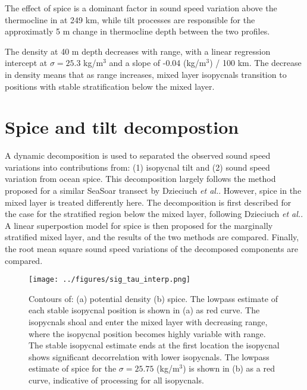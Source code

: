 \documentclass[preprint,NumberedRefs]{JASA}
\begin{document}
The effect of spice is a dominant factor in sound speed variation above the thermocline in at 249 km, while tilt processes are responsible for the approximatly 5 m change in thermocline depth between the two profiles.

The density at 40 m depth decreases with range, with a linear regression intercept at $\sigma=25.3$ kg/m$^3$ and a slope of -0.04 (kg/m$^3$) / 100 km. The decrease in density means that as range increases, mixed layer isopycnals transition to positions with stable stratification below the mixed layer.

\section{\label{sec:decomposition}Spice and tilt decompostion}
A dynamic decomposition is used to separated the observed sound speed variations into contributions from: (1) isopycnal tilt and (2) sound speed variation from ocean spice. This decomposition largely follows the method proposed for a similar SeaSoar transect by Dzieciuch \emph{et al.}\citep{dzieciuch2004}. However, spice in the mixed layer is treated differently here. The decomposition is first described for the case for the stratified region below the mixed layer, following Dzieciuch \emph{et al.}\citep{dzieciuch2004}. A linear superpostion model for spice is then proposed for the marginally stratified mixed layer, and the results of the two methods are compared. Finally, the root mean square sound speed variations of the decomposed components are compared.

\begin{figure}
\texttt{[image: ../figures/sig\_tau\_interp.png]}
    \caption{\label{fig:cntrs}{Contours of: (a) potential density (b) spice. The lowpass estimate of each stable isopycnal position is shown in (a) as red curve. The isopycnals shoal and enter the mixed layer with decreasing range, where the isopycnal position becomes highly variable with range. The stable isopycnal estimate ends at the first location the isopycnal shows significant decorrelation with lower isopycnals. The lowpass estimate of spice for the $\sigma=25.75$ (kg/m$^3$) is shown in (b) as a red curve, indicative of processing for all isopycnals.}}
\end{figure}
\end{document}
